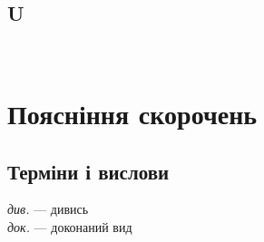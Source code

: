\begin{twocolumn}
\section{U}
\\

\end{twocolumn}

\clearpage

\onecolumn
\section{Поясніння скорочень}
\subsection{Терміни і вислови}
\textit{див.} — дивись\\
\textit{док.} — доконаний вид

\thispagestyle{empty}


